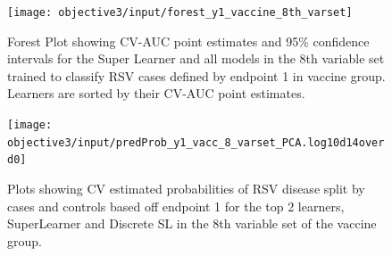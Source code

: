 \documentclass[11pt]{article}
\begin{document}
\begin{figure}[H]
    \centering
    \texttt{[image: objective3/input/forest\_y1\_vaccine\_8th\_varset]}
    \caption{Forest Plot showing CV-AUC point estimates and 95\% confidence intervals for the Super Learner and all models in the 8th variable set trained to classify RSV cases defined by endpoint 1 in vaccine group. Learners are sorted by their CV-AUC point estimates.}
    \label{fig:forest_y1_vaccine_chosenvarset}
    \end{figure}

\begin{figure}[H]
    \centering
    \texttt{[image: objective3/input/predProb\_y1\_vacc\_8\_varset\_PCA.log10d14overd0]}
    \caption{Plots showing CV estimated probabilities of RSV disease split by cases and controls based off endpoint 1 for the top 2 learners, SuperLearner and Discrete SL in the 8th variable set of the vaccine group.}
    \label{fig:predProb_y1_vacc_chosenvarset}
    \end{figure}
\end{document}

